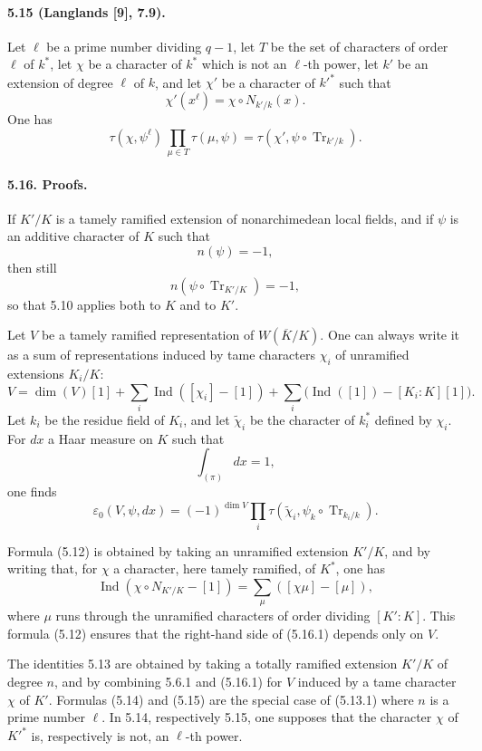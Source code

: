 \documentclass[10pt]{article}
\newcommand{\Ind}{\operatorname{Ind}}
\newcommand{\Tr}{\operatorname{Tr}}
\providecommand{\Tr}{\operatorname{Tr}}
\providecommand{\Tr}{\operatorname{Tr}}
\providecommand{\Tr}{\operatorname{Tr}}
\providecommand{\Ind}{\operatorname{Ind}}
\begin{document}
\paragraph{5.15 (Langlands [9], 7.9).} Let \(\ell\) be a prime number dividing \(q-1\), let \(T\) be the set of characters of order \(\ell\) of \(k^*\), let \(\chi\) be a character of \(k^*\) which is not an \(\ell\)-th power, let \(k'\) be an extension of degree \(\ell\) of \(k\), and let \(\chi'\) be a character of \(k'^*\) such that
\[
\chi'(x^\ell)=\chi\circ N_{k'/k}(x).
\]
One has
\[
\tau(\chi,\psi^\ell)\,
\prod_{\mu\in T}\tau(\mu,\psi)
=
\tau(\chi',\psi\circ\Tr_{k'/k}).
\]

\paragraph{5.16. Proofs.} If \(K'/K\) is a tamely ramified extension of nonarchimedean local fields, and if \(\psi\) is an additive character of \(K\) such that
\[
n(\psi)=-1,
\]
then still
\[
n(\psi\circ\Tr_{K'/K})=-1,
\]
so that 5.10 applies both to \(K\) and to \(K'\).

Let \(V\) be a tamely ramified representation of \(W(\overline K/K)\). One can always write it as a sum of representations induced by tame characters \(\chi_i\) of unramified extensions \(K_i/K\):
\[
V=\dim(V)[1]+\sum_i\Ind([\chi_i]-[1])
+\sum_i\bigl(\Ind([1])-[K_i:K][1]\bigr).
\]
Let \(k_i\) be the residue field of \(K_i\), and let \(\widetilde\chi_i\) be the character of \(k_i^*\) defined by \(\chi_i\). For \(dx\) a Haar measure on \(K\) such that
\[
\int_{(\pi)}dx=1,
\]
one finds
\[
\tag{5.16.1}
\varepsilon_0(V,\psi,dx)
=
(-1)^{\dim V}
\prod_i\tau(\widetilde\chi_i,\psi_k\circ\Tr_{k_i/k}).
\]

Formula (5.12) is obtained by taking an unramified extension \(K'/K\), and by writing that, for \(\chi\) a character, here tamely ramified, of \(K^*\), one has
\[
\Ind(\chi\circ N_{K'/K}-[1])
=
\sum_\mu([\chi\mu]-[\mu]),
\]
where \(\mu\) runs through the unramified characters of order dividing \([K':K]\). This formula (5.12) ensures that the right-hand side of (5.16.1) depends only on \(V\).

The identities 5.13 are obtained by taking a totally ramified extension \(K'/K\) of degree \(n\), and by combining 5.6.1 and (5.16.1) for \(V\) induced by a tame character \(\chi\) of \(K'\). Formulas (5.14) and (5.15) are the special case of (5.13.1) where \(n\) is a prime number \(\ell\). In 5.14, respectively 5.15, one supposes that the character \(\chi\) of \(K'^*\) is, respectively is not, an \(\ell\)-th power.
\end{document}
